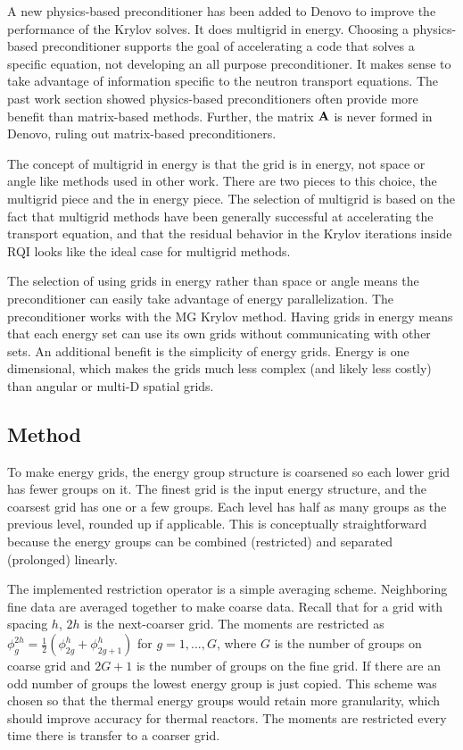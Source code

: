 A new physics-based preconditioner has been added to Denovo to improve the performance of the Krylov solves. It does multigrid in energy. Choosing a physics-based preconditioner supports the goal of accelerating a code that solves a specific equation, not developing an all purpose preconditioner. It makes sense to take advantage of information specific to the neutron transport equations. The past work section showed physics-based preconditioners often provide more benefit than matrix-based methods. Further, the matrix $\mathbf{A}$ is never formed in Denovo, ruling out matrix-based preconditioners. 

The concept of multigrid in energy is that the grid is in energy, not space or angle like methods used in other work. There are two pieces to this choice, the multigrid piece and the in energy piece. The selection of multigrid is based on the fact that multigrid methods have been generally successful at accelerating the transport equation, and that the residual behavior in the Krylov iterations inside RQI looks like the ideal case for multigrid methods. 

The selection of using grids in energy rather than space or angle means the preconditioner can easily take advantage of energy parallelization. The preconditioner works with the MG Krylov method. Having grids in energy means that each energy set can use its own grids without communicating with other sets. An additional benefit is the simplicity of energy grids. Energy is one dimensional, which makes the grids much less complex (and likely less costly) than angular or multi-D spatial grids. 

\subsection{Method}
To make energy grids, the energy group structure is coarsened so each lower grid has fewer groups on it. The finest grid is the input energy structure, and the coarsest grid has one or a few groups. Each level has half as many groups as the previous level, rounded up if applicable. This is conceptually straightforward because the energy groups can be combined (restricted) and separated (prolonged) linearly. 

The implemented restriction operator is a simple averaging scheme. Neighboring fine data are averaged together to make coarse data. Recall that for a grid with spacing $h$, $2h$ is the next-coarser grid. The moments are restricted as $\phi_{g}^{2h} = \frac{1}{2}(\phi_{2g}^{h} + \phi_{2g+1}^{h})$ for $g = 1,...,G$, where $G$ is the number of groups on coarse grid and $2G+1$ is the number of groups on the fine grid. If there are an odd number of groups the lowest energy group is just copied. This scheme was chosen so that the thermal energy groups would retain more granularity, which should improve accuracy for thermal reactors. The moments are restricted every time there is transfer to a coarser grid.

